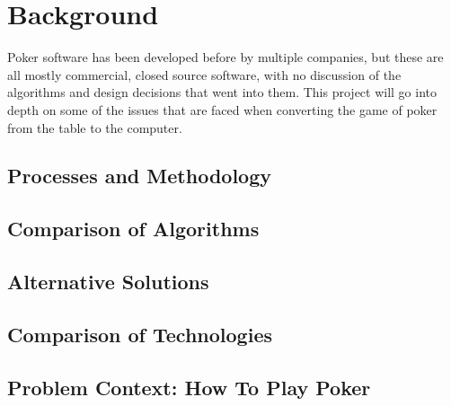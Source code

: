 \section{Background}
Poker software has been developed before by multiple companies, but these
are all mostly commercial, closed source software, with no discussion of the
algorithms and design decisions that went into them. This project will go
into depth on some of the issues that are faced when converting the game of
poker from the table to the computer.

\subsection{Processes and Methodology}

\subsection{Comparison of Algorithms}

\subsection{Alternative Solutions}

\subsection{Comparison of Technologies}

\subsection{Problem Context: How To Play Poker}

